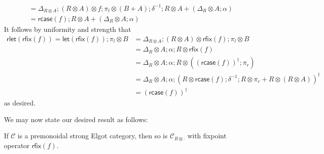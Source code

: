 \documentclass[acmsmall,screen,review]{acmart}
\newcommand{\mc}[1]{\ensuremath{\mathcal{#1}}}
\newcommand{\ms}[1]{\ensuremath{\mathsf{#1}}}
\newcommand{\dmor}[1]{{\Delta}_{#1}}
\newcommand{\lmor}[1]{\ms{let}(#1)}
\newcommand{\envcom}[2]{{#1}_{#2 \otimes \cdot}}
\newcommand{\rlmor}[1]{\ms{rlet}(#1)}
\newcommand{\rcase}[1]{\ms{rcase}(#1)}
\newcommand{\rfix}[1]{\ms{rfix}(#1)}
\begin{document}
\begin{itemize}
\begin{equation}
\begin{aligned}
      & = \dmor{R \otimes A}
        ; (R \otimes A) \otimes f
        ; \pi_l \otimes (B + A)
        ; \delta^{-1}
        ; R \otimes A + (\dmor{R} \otimes A ; \alpha) \\
      &= \rcase{f} ; R \otimes A + (\dmor{R} \otimes A ; \alpha)
    \end{aligned}
  \end{equation}
  It follows by uniformity and strength that
  \begin{equation}
    \begin{aligned}
    \rlmor{\rfix{f}} = \lmor{\rfix{f}} ; \pi_l \otimes B 
      &= \dmor{R \otimes A} ; (R \otimes A) \otimes \rfix{f} ; \pi_l \otimes B \\
      &= \dmor{R} \otimes A ; \alpha ; R \otimes \rfix{f} \\
      &= \dmor{R} \otimes A ; \alpha ; R \otimes ((\rcase{f})^\dagger ; \pi_r) \\
      &= \dmor{R} \otimes A ; \alpha
        ; (R \otimes \rcase{f} ; \delta^{-1} ; R \otimes \pi_r + R \otimes (R \otimes A))^\dagger \\
      &= (\rcase{f})^\dagger
    \end{aligned}
  \end{equation}
  as desired.
\end{itemize}
We may now state our desired result as follows:
\begin{lemma}
  If $\mc{C}$ is a premonoidal strong Elgot category, then so is $\envcom{\mc{C}}{R}$ with
  fixpoint operator $\rfix{f}$.
\end{lemma}
\end{document}
